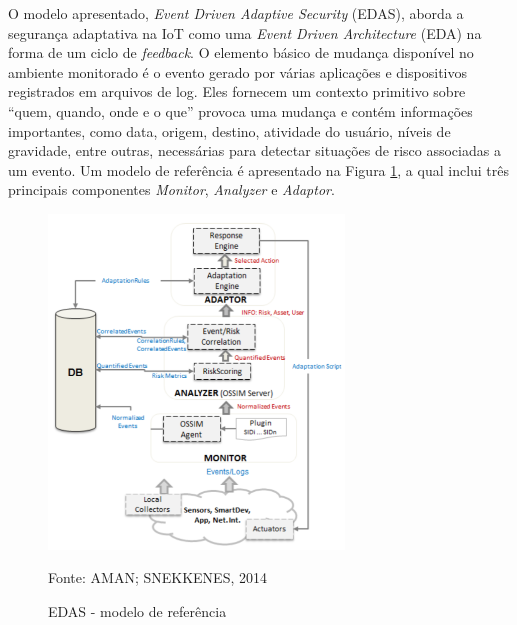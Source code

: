 \documentclass[tid,table]{texufpel} %
\begin{document}
O modelo apresentado, \textit{Event Driven Adaptive Security} (EDAS), aborda a segurança adaptativa na IoT como uma \textit{Event Driven Architecture} (EDA) na forma de um ciclo de \textit{feedback}. O elemento básico de mudança disponível no ambiente monitorado é o evento gerado por várias aplicações e dispositivos registrados em arquivos de log. Eles fornecem um contexto primitivo sobre ``quem, quando, onde e o que'' provoca uma mudança e contém informações importantes, como data, origem, destino, atividade do usuário, níveis de gravidade, entre outras, necessárias para detectar situações de risco associadas a um evento. Um modelo de referência é apresentado na Figura \ref{edas-reference-model}, a qual inclui três principais componentes \textit{Monitor}, \textit{Analyzer} e \textit{Adaptor}.

\begin{figure}[ht]
\centering
\includegraphics[width=0.7\textwidth]{imagens/edas-reference-model.png}
\caption{EDAS - modelo de referência}
\label{edas-reference-model}
Fonte: AMAN; SNEKKENES, 2014
\end{figure}
\end{document}
